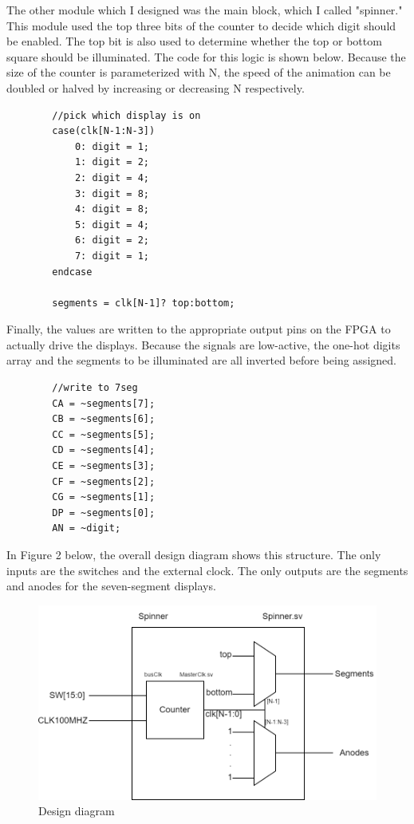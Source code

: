 \documentclass{article}
\begin{document}
	The other module which I designed was the main block, which I called "spinner." This module used the top three bits of the counter to decide which digit should be enabled. The top bit is also used to determine whether the top or bottom square should be illuminated. The code for this logic is shown below. Because the size of the counter is parameterized with N, the speed of the animation can be doubled or halved by increasing or decreasing N respectively.
	  \begin{verbatim}
		//pick which display is on
		case(clk[N-1:N-3])
			0: digit = 1;
			1: digit = 2;
			2: digit = 4;
			3: digit = 8;
			4: digit = 8;
			5: digit = 4;
			6: digit = 2;
			7: digit = 1;
		endcase
		
		segments = clk[N-1]? top:bottom; 
	\end{verbatim}
	
	Finally, the values are written to the appropriate output pins on the FPGA to actually drive the displays. Because the signals are low-active, the one-hot digits array and the segments to be illuminated are all inverted before being assigned.
	\begin{verbatim}
		//write to 7seg
		CA = ~segments[7];
		CB = ~segments[6];
		CC = ~segments[5];
		CD = ~segments[4];
		CE = ~segments[3];
		CF = ~segments[2];
		CG = ~segments[1];
		DP = ~segments[0];
		AN = ~digit;
	\end{verbatim}
	
	In Figure 2 below, the overall design diagram shows this structure. The only inputs are the switches and the external clock. The only outputs are the segments and anodes for the seven-segment displays.
	
	\begin{figure}[H]
		\centering
		\includegraphics[width=0.7\linewidth]{"SOCHW1chart"}
		\caption{Design diagram}
		\label{fig:diagram}
	\end{figure}
	
\end{document}
